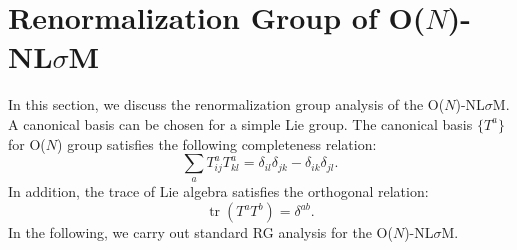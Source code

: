 \documentclass[aps,prb,superscriptaddress,nofootinbib]{revtex4}
\def \tr{\operatorname{tr}}
\begin{document}
\section{Renormalization Group of O($N$)-NL$\sigma$M}

In this section, we discuss the renormalization group analysis of the O($N$)-NL$\sigma$M.
A canonical basis can be chosen for a simple Lie group.
The canonical basis $\{T^a\}$ for O($N$) group satisfies the following completeness relation:
\begin{equation}\label{eq:com-rel}
	\sum_{a} T_{i j}^{a} T_{k l}^{a} =\delta_{i l} \delta_{j k}-\delta_{i k} \delta_{j l}.
\end{equation} 
In addition, the trace of Lie algebra satisfies the orthogonal relation:
\begin{equation}
	\tr\left(T^{a} T^{b}\right)=\delta^{a b}.
\end{equation}
In the following, we carry out standard RG analysis for the O($N$)-NL$\sigma$M.
\end{document}
